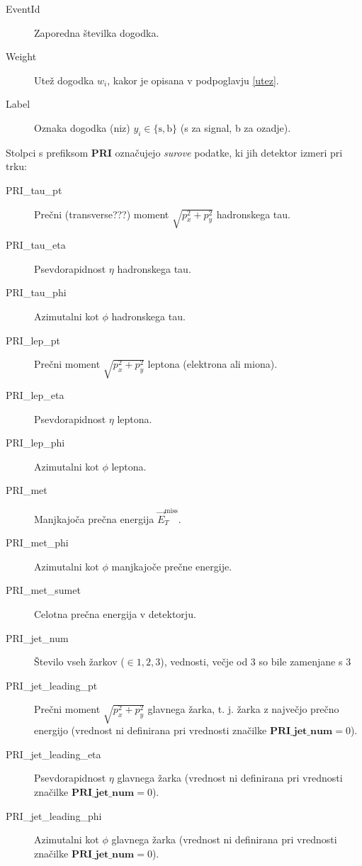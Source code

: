 \documentclass[11pt,a4paper,openany]{book}
\begin{document}
\begin{changemargin}{0.5cm}{0.0cm} 
\begin{description}
	\item [EventId] 	Zaporedna številka dogodka.
	\item [Weight]  	Utež dogodka $w_i$, kakor je opisana v podpoglavju \ref{utez}.
	\item [Label] 		Oznaka dogodka (niz) $y_i \in \{\text{s}, \text{b}\}$ (s za signal, b za ozadje).	
\end{description}
\end{changemargin}

Stolpci s prefiksom \textbf{PRI} označujejo \textit{surove} podatke, ki jih detektor izmeri pri trku:
\begin{changemargin}{0.5cm}{0.0cm} 
\begin{description}
	\item[PRI\_tau\_pt] Prečni (transverse???) moment $\sqrt{p_x^2 + p_y^2}$ hadronskega tau.
	\item[PRI\_tau\_eta] Psevdorapidnost $\eta$ hadronskega tau.
	\item[PRI\_tau\_phi] Azimutalni kot $\phi$ hadronskega tau.
	
	\item[PRI\_lep\_pt] Prečni moment $\sqrt{p_x^2 + p_y^2}$ leptona (elektrona ali miona).
	\item[PRI\_lep\_eta] Psevdorapidnost $\eta$ leptona.
	\item[PRI\_lep\_phi] Azimutalni kot $\phi$ leptona.
	
	\item[PRI\_met] Manjkajoča prečna energija $\vec{E}_T^{\text{miss}}$.
	\item[PRI\_met\_phi] Azimutalni kot $\phi$ manjkajoče prečne energije.
	
	\item[PRI\_met\_sumet] Celotna prečna energija v detektorju.
	
	\item[PRI\_jet\_num] Število vseh žarkov ($\in {1, 2, 3}$), vednosti, večje od $3$ so bile zamenjane s 3
	
	\item[PRI\_jet\_leading\_pt] Prečni moment $\sqrt{p_x^2 + p_y^2}$ glavnega žarka, t. j. žarka z največjo prečno energijo (vrednost ni definirana pri vrednosti značilke $\textbf{PRI\_jet\_num} = 0$).
	\item[PRI\_jet\_leading\_eta] Psevdorapidnost $\eta$ glavnega žarka (vrednost ni definirana pri vrednosti značilke $\textbf{PRI\_jet\_num} = 0$).
	\item[PRI\_jet\_leading\_phi] Azimutalni kot $\phi$ glavnega žarka (vrednost ni definirana pri vrednosti značilke $\textbf{PRI\_jet\_num} = 0$).
	

\end{description}
\end{changemargin}
\end{document}
